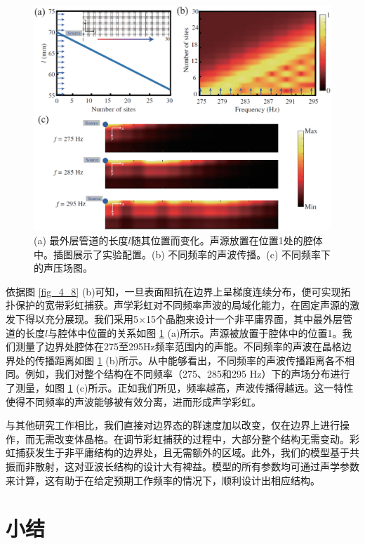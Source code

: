 \begin{figure}[h!]
    \centering
    \includegraphics[width=1\textwidth]{images/fig4-9.eps} 
    \caption{(a) 最外层管道的长度$l$随其位置而变化。声源放置在位置1处的腔体中。插图展示了实验配置。(b) 不同频率的声波传播。(c) 不同频率下的声压场图。}
    \label{fig_4_9}
\end{figure} 

依据图 \ref{fig_4_8} (b)可知，一旦表面阻抗在边界上呈梯度连续分布，便可实现拓扑保护的宽带彩虹捕获\cite{C41-1,C41-2,C41-3}。声学彩虹对不同频率声波的局域化能力，在固定声源的激发下得以充分展现。我们采用5×15个晶胞来设计一个非平庸界面，其中最外层管道的长度$l$与腔体中位置的关系如图 \ref{fig_4_9} (a)所示。声源被放置于腔体中的位置1。我们测量了边界处腔体在275至295Hz频率范围内的声能。不同频率的声波在晶格边界处的传播距离如图 \ref{fig_4_9} (b)所示。从中能够看出，不同频率的声波传播距离各不相同。例如，我们对整个结构在不同频率（275、285和295 Hz）下的声场分布进行了测量，如图 \ref{fig_4_9} (c)所示。正如我们所见，频率越高，声波传播得越远。这一特性使得不同频率的声波能够被有效分离，进而形成声学彩虹。

与其他研究工作相比，我们直接对边界态的群速度加以改变，仅在边界上进行操作，而无需改变体晶格。在调节彩虹捕获的过程中，大部分整个结构无需变动。彩虹捕获发生于非平庸结构的边界处，且无需额外的区域。此外，我们的模型基于共振而非散射，这对亚波长结构的设计大有裨益。模型的所有参数均可通过声学参数来计算，这有助于在给定预期工作频率的情况下，顺利设计出相应结构。

\section{小结}

